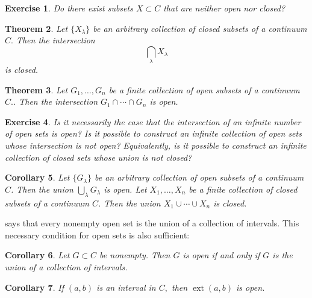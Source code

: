 \documentclass{amsart}
\newtheorem{theorem}{Theorem}
\newtheorem{corollary}[theorem]{Corollary}
\newtheorem{exercise}[theorem]{Exercise}
\newcommand{\1}{\mathds{1}}
\DeclareMathOperator{\ext}{ext}
\numberwithin{equation}{section}
\numberwithin{theorem}{section}
\begin{document}
\begin{exercise}  Do there exist subsets $X \subset C$ that are neither open nor closed?
\end{exercise}



\begin{theorem}  Let $\{X_{\lambda} \}$ be an arbitrary collection of closed subsets of a continuum $C.$  Then the intersection
\[
	\bigcap_{\lambda} X_{\lambda}
\]
is closed.
\end{theorem}

\begin{theorem} \label{*} Let $G_1, \dotsc, G_n$ be a finite collection of open subsets of a continuum $C.$.  Then the intersection $G_1 \cap \dotsm \cap G_n$ is open.
\end{theorem}


\begin{exercise}  Is it necessarily the case that the intersection of an infinite number of open sets is open? Is it possible to construct an infinite collection of open sets whose intersection is not open?  Equivalently, is it possible to construct an infinite collection of closed sets whose union is not closed?
\end{exercise} 

\begin{corollary}\label{fortop2}  Let $\{G_{\lambda} \}$ be an arbitrary collection of open subsets of a continuum $C$.  Then the union $\bigcup_{\lambda} G_{\lambda}$ is open.  Let $X_1, \dotsc, X_n$ be a finite collection of closed subsets of a continuum $C$.  Then the union $X_1 \cup \dotsm \cup X_n$ is closed.
\end{corollary}

 says that every nonempty open set is the union of a collection of intervals.  This necessary condition for open sets is also sufficient:


 \begin{corollary}
 Let $G \subset C$ be nonempty.  Then $G$ is open if and only if $G$ is the union of a collection of intervals.
\end{corollary}

\begin{corollary} If $(a, b)$ is an interval in $C,$ then $\ext(a,b)$ is open.
\end{corollary} 
\end{document}
